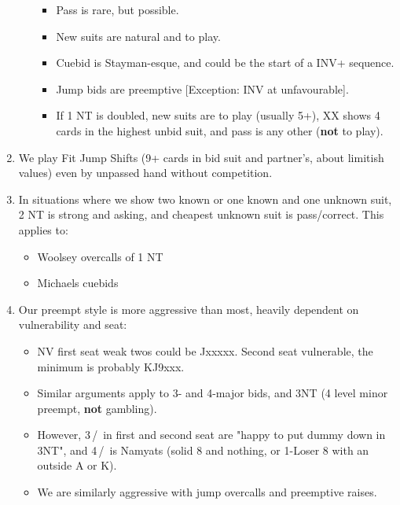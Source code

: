 \documentclass[12pt,twocolumn]{article}
\begin{document}
\begin{scriptsize}
\begin{enumerate}
\begin{enumerate}[label*=\arabic*.,nosep]
\begin{itemize}
                \item Pass is rare, but possible.
                \item New suits are natural and to play.
                \item Cuebid is Stayman-esque, and could be the start of a INV+ sequence.
                \item Jump bids are preemptive [Exception: INV at unfavourable].
                \item If 1 NT is doubled, new suits are to play (usually 5+), XX shows 4 cards in the highest unbid suit, and pass is any other (\textbf{not} to play).
            \end{itemize}
        \end{enumerate}
        \item We play Fit Jump Shifts (9+ cards in bid suit and partner's, about limitish values) even by unpassed hand without competition.
        \item In situations where we show two known or one known and one unknown suit, 2 NT is strong and asking, and cheapest unknown suit is pass/correct.
         This applies to:
        \begin{itemize}[nosep]
            \item Woolsey overcalls of 1 NT
            \item Michaels cuebids
        \end{itemize}
        \item Our preempt style is more aggressive than most, heavily dependent on vulnerability and seat:
        \begin{itemize}[nosep]
            \item NV first seat weak twos could be Jxxxxx.
             Second seat vulnerable, the minimum is probably KJ9xxx.
            \item Similar arguments apply to 3- and 4-major bids, and 3NT (4 level minor preempt, \textbf{not} gambling).
            \item However, 3\,\bc/\rd\ in first and second seat are "happy to put dummy down in 3NT", and 4\,\bc/\rd\ is Namyats (solid 8 and nothing, or 1-Loser 8 with an outside A or K).
            \item We are similarly aggressive with jump overcalls and preemptive raises.
        \end{itemize}
    \end{enumerate}
\end{scriptsize}
\end{document}
